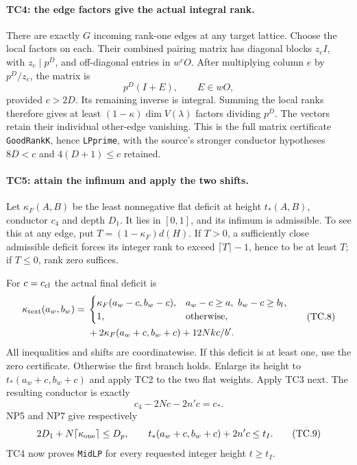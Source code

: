 \paragraph{TC4: the edge factors give the actual integral rank.}
There are exactly $G$ incoming rank-one edges at any target
lattice. Choose the local factors on each. Their combined pairing
matrix has diagonal blocks $z_eI$, with $z_e\mid p^D$, and
off-diagonal entries in $w^cO$. After multiplying column $e$
by $p^D/z_e$, the matrix is
\[
                         p^D(I+E),\qquad E\in wO,      \tag{TC.7}
\]
provided $c>2D$. Its remaining inverse is integral. Summing
the local ranks therefore gives at least
$(1-\kappa)\dim V(\lambda)$ factors dividing $p^D$.
The vectors retain their individual other-edge vanishing.
This is the full matrix certificate \texttt{GoodRankK}, hence
\texttt{LPprime}, with the source's stronger conductor hypotheses
$8D<c$ and $4(D+1)\le c$ retained.

\paragraph{TC5: attain the infimum and apply the two shifts.}
Let $\kappa_F(A,B)$ be the least nonnegative flat deficit at
height $t_*(A,B)$, conductor $c_4$ and depth $D_1$.
It lies in $[0,1]$, and its infimum is admissible.
To see this at any edge, put $T=(1-\kappa_F)d(H)$.
If $T>0$, a sufficiently close admissible deficit forces its
integer rank to exceed $\lceil T\rceil-1$, hence to be at least
$T$; if $T\le0$, rank zero suffices.

For $c=c_{\rm cl}$ the actual final deficit is
\[
 \begin{split}
 \kappa_{\rm text}(a_w,b_w)
  ={}&\begin{cases}
      \kappa_F(a_w-c,b_w-c),&
          a_w-c\ge a,\ b_w-c\ge b_l,\\
      1,&\text{otherwise},
      \end{cases}\\
     &+2\kappa_F(a_w+c,b_w+c)+12Nkc/b'.
 \end{split}                                           \tag{TC.8}
\]
All inequalities and shifts are coordinatewise. If this deficit
is at least one, use the zero certificate. Otherwise the first
branch holds. Enlarge its height to $t_*(a_w+c,b_w+c)$ and
apply TC2 to the two flat weights. Apply TC3 next. The resulting
conductor is exactly
\[
 c_4-2Nc-2n'c=c_*.
\]
NP5 and NP7 give respectively
\[
 2D_1+N\lceil\kappa_{\rm one}\rceil\le D_p,\qquad
 t_*(a_w+c,b_w+c)+2n'c\le t_I.                         \tag{TC.9}
\]
TC4 now proves \texttt{MidLP} for every requested integer
height $t\ge t_I$.

